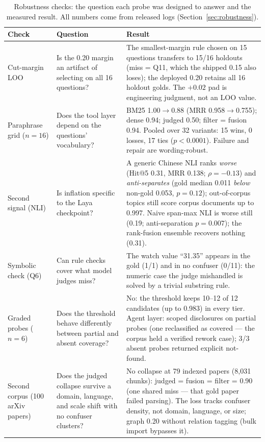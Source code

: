 \begin{table}[!htbp]
\centering
\footnotesize
\setlength{\tabcolsep}{3.5pt}
\caption{Robustness checks: the question each probe was designed to answer
and the measured result. All numbers come from released logs
(Section~\ref{sec:robustness}).}
\label{tab:robustness}
\begin{tabular}{p{2.9cm}p{4.0cm}p{6.1cm}}
\toprule
Check & Question & Result \\
\midrule
Cut-margin LOO & Is the 0.20 margin an artifact of selecting on all 16
questions? & The smallest-margin rule chosen on 15 questions transfers to
15/16 holdouts (miss = Q11, which the shipped 0.15 also loses); the
deployed 0.20 retains all 16 holdout golds. The $+0.02$ pad is
engineering judgment, not an LOO value. \\
Paraphrase grid ($n{=}16$) & Does the tool layer depend on the questions'
vocabulary? & BM25 1.00$\to$0.88 (MRR 0.958$\to$0.755); dense 0.94;
judged 0.50; filter = fusion 0.94. Pooled over 32 variants: 15 wins,
0 losses, 17 ties ($p < 0.0001$). Failure and repair are wording-robust. \\
Second signal (NLI) & Is inflation specific to the Laya checkpoint? &
A generic Chinese NLI ranks \emph{worse} (Hit@5 0.31, MRR 0.138;
$\rho = -0.13$) and \emph{anti-separates} (gold median 0.011 \emph{below}
non-gold 0.053, $p = 0.12$); out-of-corpus topics still score corpus
documents up to 0.997. Naive span-max NLI is worse still (0.19;
anti-separation $p = 0.007$); the rank-fusion ensemble recovers nothing
(0.31). \\
Symbolic check (Q6) & Can rule checks cover what model judges miss? &
The watch value ``31.35'' appears in the gold (1/1) and in no confuser
(0/11): the numeric case the judge mishandled is solved by a trivial
substring rule. \\
Graded probes ($n{=}6$) & Does the threshold behave differently between
partial and absent coverage? & No: the threshold keeps 10--12 of 12
candidates (up to 0.983) in every tier. Agent layer: scoped disclosures
on partial probes (one reclassified as covered --- the corpus held a
verified rework case); 3/3 absent probes returned explicit not-found. \\
Second corpus (100 arXiv papers) & Does the judged collapse survive a
domain, language, and scale shift with no confuser clusters? & No
collapse at 79 indexed papers (8{,}031 chunks): judged = fusion =
filter = 0.90 (one shared miss --- that gold paper failed parsing).
The loss tracks confuser density, not domain, language, or size;
graph 0.20 without relation tagging (bulk import bypasses it). \\
\bottomrule
\end{tabular}
\end{table}

